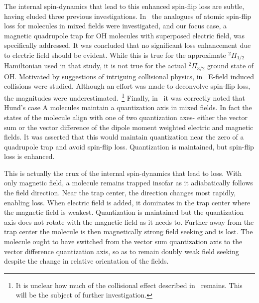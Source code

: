 \documentclass[%
 reprint,
groupedaddress,
 amsmath,amssymb,
 aps,
prl,
]{revtex4-1}
\begin{document}
The internal spin-dynamics that lead to this enhanced spin-flip loss are subtle, having eluded three previous investigations. In~\cite{Lara2008} the analogues of atomic spin-flip loss for molecules in mixed fields were investigated, and our focus case, a magnetic quadrupole trap for OH molecules with superposed electric field, was specifically addressed. It was concluded that no significant loss enhancement due to electric field should be evident. While this is true for the approximate $^2\Pi_{1/2}$ Hamiltonian used in that study, it is not true for the actual $^2\Pi_{3/2}$ ground state of OH. Motivated by suggestions of intriguing collisional physics, in~\cite{Stuhl2013} E-field induced collisions were studied. Although an effort was made to deconvolve spin-flip loss, the magnitudes were underestimated.~\footnote{It is unclear how much of the collisional effect described in~\cite{Stuhl2013} remains. This will be the subject of further investigation.} Finally, in~\cite{Bohn2013} it was correctly noted that Hund's case A molecules maintain a quantization axis in mixed fields. In fact the states of the molecule align with one of two quantization axes- either the vector sum or the vector difference of the dipole moment weighted electric and magnetic fields. It was asserted that this would maintain quantization near the zero of a quadrupole trap and avoid spin-flip loss. Quantization is maintained, but spin-flip loss is enhanced.

This is actually the crux of the internal spin-dynamics that lead to loss. With only magnetic field, a molecule remains trapped insofar as it adiabatically follows the field direction. Near the trap center, the direction changes most rapidly, enabling loss. When electric field is added, it dominates in the trap center where the magnetic field is weakest. Quantization is maintained but the quantization axis does not rotate with the magnetic field as it needs to. Further away from the trap center the molecule is then magnetically strong field seeking and is lost. The molecule ought to have switched from the vector sum quantization axis to the vector difference quantization axis, so as to remain doubly weak field seeking despite the change in relative orientation of the fields. %
\end{document}
